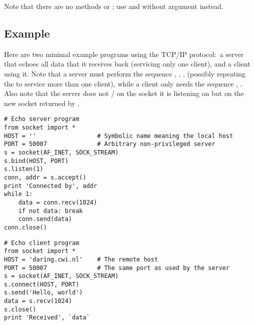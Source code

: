 Note that there are no methods  or ;
use  and  without  argument
instead.

\subsection{Example}

Here are two minimal example programs using the TCP/IP protocol:\ a
server that echoes all data that it receives back (servicing only one
client), and a client using it.  Note that a server must perform the
sequence , , ,
 (possibly repeating the  to service
more than one client), while a client only needs the sequence
, .  Also note that the server
does not / on the 
socket it is listening on but on the new socket returned by
.

\begin{verbatim}
# Echo server program
from socket import *
HOST = ''                 # Symbolic name meaning the local host
PORT = 50007              # Arbitrary non-privileged server
s = socket(AF_INET, SOCK_STREAM)
s.bind(HOST, PORT)
s.listen(1)
conn, addr = s.accept()
print 'Connected by', addr
while 1:
    data = conn.recv(1024)
    if not data: break
    conn.send(data)
conn.close()
\end{verbatim}

\begin{verbatim}
# Echo client program
from socket import *
HOST = 'daring.cwi.nl'    # The remote host
PORT = 50007              # The same port as used by the server
s = socket(AF_INET, SOCK_STREAM)
s.connect(HOST, PORT)
s.send('Hello, world')
data = s.recv(1024)
s.close()
print 'Received', `data`
\end{verbatim}

\begin{seealso}
\end{seealso}
